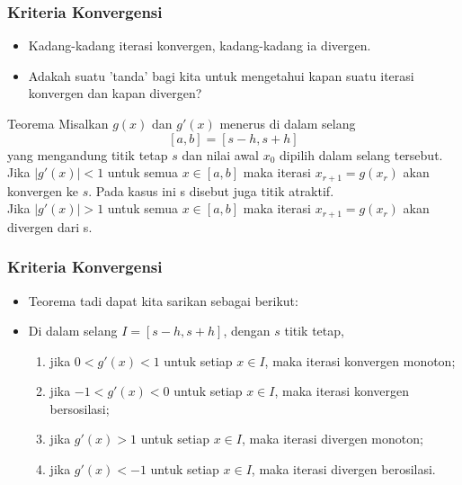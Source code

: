 \documentclass[pdflatex,compress]{beamer}
\begin{document}
\begin{frame}
	\frametitle{Kriteria Konvergensi}
	\begin{itemize}
		\item Kadang-kadang iterasi konvergen, kadang-kadang ia divergen.
		\item Adakah suatu 'tanda' bagi kita untuk mengetahui kapan suatu iterasi konvergen dan kapan divergen?
	\end{itemize}

	\begin{block}{Teorema}
		Misalkan $ g(x) $ dan $ g'(x) $ menerus di dalam selang \[ [a,b] = [s-h, s+h] \] yang mengandung titik tetap $ s $ dan nilai awal $ x_0 $ dipilih dalam selang tersebut.\\
		Jika $ |g'(x)| < 1 $ untuk semua $ x \in [a, b] $ maka iterasi $ x_{r+1} = g(x_r) $ akan konvergen ke $ s $. Pada kasus ini s disebut juga titik atraktif.\\
		Jika $ |g'(x)| > 1 $ untuk semua $ x \in [a, b] $ maka iterasi $ x_{r+1} = g(x_r) $
		akan divergen dari s.
	\end{block}
\end{frame}

\begin{frame}
	\frametitle{Kriteria Konvergensi}
	\begin{itemize}
		\item Teorema tadi dapat kita sarikan sebagai berikut:
		\item Di dalam selang $ I = [s-h, s+h] $, dengan $ s $ titik tetap,
		\begin{enumerate}
			\item jika $ 0 < g'(x) < 1 $ untuk setiap $ x \in I $, maka iterasi konvergen monoton;
			\item jika $ -1 < g'(x) < 0 $ untuk setiap $ x \in I $, maka iterasi konvergen bersosilasi;
			\item jika $ g'(x) > 1 $ untuk setiap $ x \in I $, maka iterasi divergen monoton;
			\item jika $ g'(x) < -1 $ untuk setiap $ x \in I $, maka iterasi divergen berosilasi.
		\end{enumerate}
	\end{itemize}
\end{frame}
\end{document}
